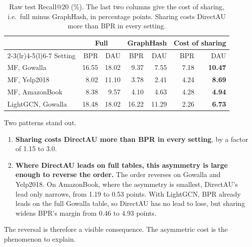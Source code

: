 \begin{table}[t]
  \caption{Raw test Recall@20 (\%). The last two columns give the cost of sharing, i.e.\ full minus GraphHash, in percentage points. Sharing costs DirectAU more than BPR in every setting.}
  \label{tab:problem}
  \small
  \setlength{\tabcolsep}{4pt}
  \begin{tabular}{@{}lrrrrrr@{}}
    \toprule
    & \multicolumn{2}{c}{Full} & \multicolumn{2}{c}{GraphHash} & \multicolumn{2}{c}{Cost of sharing} \\
    \cmidrule(lr){2-3}\cmidrule(lr){4-5}\cmidrule(l){6-7}
    Setting & BPR & DAU & BPR & DAU & BPR & DAU \\
    \midrule
    MF, Gowalla       & 16.55 & 18.02 & 9.37  & 7.55  & 7.18 & \textbf{10.47} \\
    MF, Yelp2018      &  8.02 & 11.10 & 3.78  & 2.41  & 4.24 & \textbf{8.69} \\
    MF, AmazonBook    &  8.38 &  9.57 & 4.10  & 4.63  & 4.28 & \textbf{4.94} \\
    \midrule
    LightGCN, Gowalla & 18.48 & 18.02 & 16.22 & 11.29 & 2.26 & \textbf{6.73} \\
    \bottomrule
  \end{tabular}
\end{table}

Two patterns stand out.
\begin{enumerate}
  \item \textbf{Sharing costs DirectAU more than BPR in every setting}, by a factor of 1.15 to 3.0.
  \item \textbf{Where DirectAU leads on full tables, this asymmetry is large enough to reverse the order.} The order reverses on Gowalla and Yelp2018. On AmazonBook, where the asymmetry is smallest, DirectAU's lead only narrows, from 1.19 to 0.53 points. With LightGCN, BPR already leads on the full Gowalla table, so DirectAU has no lead to lose, but sharing widens BPR's margin from 0.46 to 4.93 points.
\end{enumerate}
The reversal is therefore a visible consequence. The asymmetric cost is the phenomenon to explain.

\medskip
\noindent{}
\medskip

